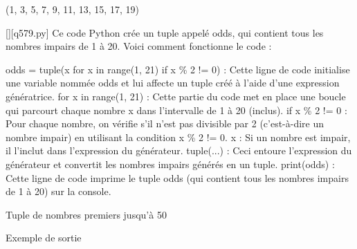 (1, 3, 5, 7, 9, 11, 13, 15, 17, 19)
        \par
        \begin{solution}
            \renewcommand{\nomfichier}{q579.py}
            \pythonfile{\chemincode \nomfichier}[][\nomfichier]
            Ce code Python crée un tuple appelé odds, qui contient tous les nombres impairs de 1 à 20. Voici comment fonctionne le code :

    odds = tuple(x for x in range(1, 21) if x \% 2 != 0) : Cette ligne de code initialise une variable nommée odds et lui affecte un tuple créé à l'aide d'une expression génératrice.
        for x in range(1, 21) : Cette partie du code met en place une boucle qui parcourt chaque nombre x dans l'intervalle de 1 à 20 (inclus).
        if x \% 2 != 0 : Pour chaque nombre, on vérifie s'il n'est pas divisible par 2 (c'est-à-dire un nombre impair) en utilisant la condition x \% 2 != 0.
        x : Si un nombre est impair, il l'inclut dans l'expression du générateur.
        tuple(...) : Ceci entoure l'expression du générateur et convertit les nombres impairs générés en un tuple.
    print(odds) : Cette ligne de code imprime le tuple odds (qui contient tous les nombres impairs de 1 à 20) sur la console.
        \end{solution}
        

        \question
        Tuple de nombres premiers jusqu'à 50

Exemple de sortie

